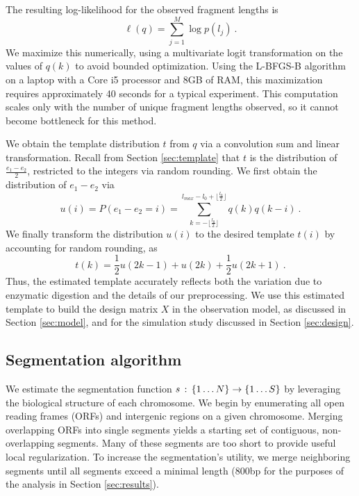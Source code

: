 The resulting log-likelihood for the observed fragment lengths is
\begin{equation}
\ell(q) = \sum_{j = 1}^{M} \log p(l_j) \ .
\end{equation}
We maximize this numerically, using a multivariate logit transformation on the values of $q(k)$ to avoid bounded optimization.
Using the L-BFGS-B algorithm \citep{lbfgsb1997} on a laptop with a Core i5 processor and 8GB of RAM, this maximization requires approximately 40 seconds for a typical experiment.
This computation scales only with the number of unique fragment lengths observed, so it cannot become bottleneck for this method.

We obtain the template distribution $t$ from $q$ via a convolution sum and  linear transformation.
Recall from Section \ref{sec:template} that $t$ is the distribution of $\frac{e_1-e_2}{2}$, restricted to the integers via random rounding.
We first obtain the distribution of $e_1-e_2$ via
\begin{equation}
 u(i) = P(e_1-e_2=i) = \sum_{k=-\lfloor \frac{l_0}{2} \rfloor}^{
 l_{max} - l_0 + \lfloor \frac{l_0}{2} \rfloor}
 q(k) q(k-i) \ .
\end{equation}
We finally transform the distribution $u(i)$ to the desired template $t(i)$ by accounting for random rounding, as
\begin{equation}
 t(k) = \frac{1}{2}u(2k-1) + u(2k) + \frac{1}{2}u(2k+1) \ .
\end{equation}
Thus, the estimated template accurately reflects both the variation due to enzymatic digestion and the details of our preprocessing.
We use this estimated template to build the design matrix $X$ in the observation model, as discussed in Section \ref{sec:model}, and for the simulation study discussed in Section \ref{sec:design}.

\subsection{Segmentation algorithm}
\label{sec:segmentationAlgorithm}

We estimate the segmentation function $s \,:\, \left\{1 \ldots N\right\} \rightarrow \left\{1 \ldots S\right\}$ by leveraging the biological structure of each chromosome.
We begin by enumerating all open reading frames (ORFs) and intergenic regions on a given chromosome.
Merging overlapping ORFs into single segments yields a starting set of contiguous, non-overlapping segments.
Many of these segments are too short to provide useful local regularization.
To increase the segmentation's utility, we merge neighboring segments until all segments exceed a minimal length (800bp for the purposes of the analysis in Section \ref{sec:results}).

